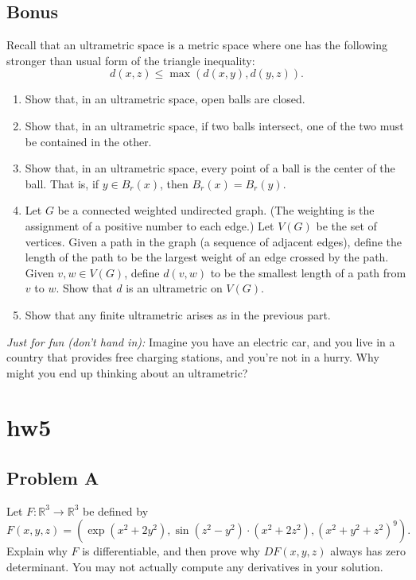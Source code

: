 \documentclass[lang=en,11pt]{template}
\begin{document}
\section*{Bonus}
Recall that an ultrametric space is a metric space where one has the following stronger than usual form of the triangle inequality:
\[
d(x, z) \leq \max(d(x, y), d(y, z)).
\]
\begin{enumerate}
    \item Show that, in an ultrametric space, open balls are closed.
    \item Show that, in an ultrametric space, if two balls intersect, one of the two must be contained in the other.
    \item Show that, in an ultrametric space, every point of a ball is the center of the ball. That is, if \( y \in B_r(x) \), then \( B_r(x) = B_r(y) \).
    \item Let \( G \) be a connected weighted undirected graph. (The weighting is the assignment of a positive number to each edge.) Let \( V(G) \) be the set of vertices. Given a path in the graph (a sequence of adjacent edges), define the length of the path to be the largest weight of an edge crossed by the path. Given \( v, w \in V(G) \), define \( d(v, w) \) to be the smallest length of a path from \( v \) to \( w \). Show that \( d \) is an ultrametric on \( V(G) \).
    \item Show that any finite ultrametric arises as in the previous part.
\end{enumerate}

\textit{Just for fun (don’t hand in):} Imagine you have an electric car, and you live in a country that provides free charging stations, and you’re not in a hurry. Why might you end up thinking about an ultrametric?



\chapter{hw5}

\section*{Problem A}
Let $F : \mathbb{R}^3 \to \mathbb{R}^3$ be defined by
\[
F(x, y, z) = (\exp(x^2 + 2y^2), \sin(z^2 - y^2) \cdot (x^2 + 2z^2), (x^2 + y^2 + z^2)^9).
\]
Explain why $F$ is differentiable, and then prove why $DF(x, y, z)$ always has zero determinant. You may not actually compute any derivatives in your solution.
\end{document}
